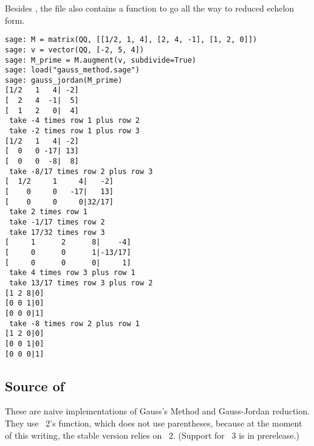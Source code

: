 Besides \!, the file also contains a 
 function
to go all the way to reduced echelon form.
\begin{lstlisting}
sage: M = matrix(QQ, [[1/2, 1, 4], [2, 4, -1], [1, 2, 0]])
sage: v = vector(QQ, [-2, 5, 4])
sage: M_prime = M.augment(v, subdivide=True)
sage: load("gauss_method.sage")
sage: gauss_jordan(M_prime)
[1/2   1   4| -2]
[  2   4  -1|  5]
[  1   2   0|  4]
 take -4 times row 1 plus row 2
 take -2 times row 1 plus row 3
[1/2   1   4| -2]
[  0   0 -17| 13]
[  0   0  -8|  8]
 take -8/17 times row 2 plus row 3
[  1/2     1     4|   -2]
[    0     0   -17|   13]
[    0     0     0|32/17]
 take 2 times row 1
 take -1/17 times row 2
 take 17/32 times row 3
[     1      2      8|    -4]
[     0      0      1|-13/17]
[     0      0      0|     1]
 take 4 times row 3 plus row 1
 take 13/17 times row 3 plus row 2
[1 2 8|0]
[0 0 1|0]
[0 0 0|1]
 take -8 times row 2 plus row 1
[1 2 0|0]
[0 0 1|0]
[0 0 0|1]
\end{lstlisting}



\subsection{Source of \protect{}}

These are naive implementations of Gauss's Method and 
Gauss-Jordan reduction.
They use \python~2's  function, which
does not use parentheses, 
because at the moment of this writing, 
the stable \Sage{} version relies on \python~2.
(Support for \python~3 is in prerelease.)


\endinput


TODO:
